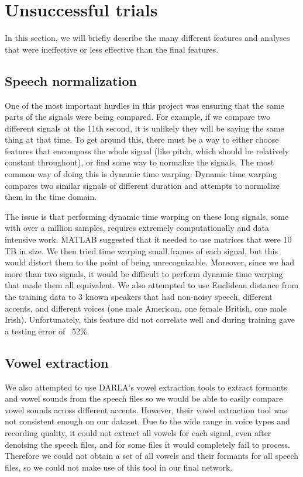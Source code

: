 \documentclass{article}
\begin{document}
\section{Unsuccessful trials}
\label{sec:unsuccessful}

In this section, we will briefly describe the many different features and analyses that were ineffective or less effective than the final features.

\subsection{Speech normalization}
\label{subsec:normalization}

One of the most important hurdles in this project was ensuring that the same parts of the signals were being compared.
For example, if we compare two different signals at the 11th second, it is unlikely they will be saying the same thing at that time.
To get around this, there must be a way to  either choose features that encompass the whole signal (like pitch, which should be relatively constant throughout), or find some way to normalize the signals.
The most common way of doing this is dynamic time warping.
Dynamic time warping compares two similar signals of different duration and attempts to normalize them in the time domain.

The issue is that performing dynamic time warping on these long signals, some with over a million samples, requires extremely computationally and data intensive work.
MATLAB suggested that it needed to use matrices that were 10 TB in size.
We then tried time warping small frames of each signal, but this would distort them to the point of being unrecognizable.
Moreover, since we had more than two signals, it would be difficult to perform dynamic time warping that made them all equivalent.
We also attempted to use Euclidean distance from the training data to 3 known speakers that had non-noisy speech, different accents, and different voices (one male American, one female British, one male Irish).
Unfortunately, this feature did not correlate well and during training gave a testing error of ~52\%.

\subsection{Vowel extraction}
\label{subsec:vowel}

We also attempted to use DARLA’s vowel extraction tools \cite{DARLA} to extract formants and vowel sounds from the speech files so we would be able to easily compare vowel sounds across different accents.
However, their vowel extraction tool was not consistent enough on our dataset.
Due to the wide range in voice types and recording quality, it could not extract all vowels for each signal, even after denoising the speech files, and for some files it would completely fail to process.
Therefore we could not obtain a set of all vowels and their formants for all speech files, so we could not make use of this tool in our final network.
\end{document}
